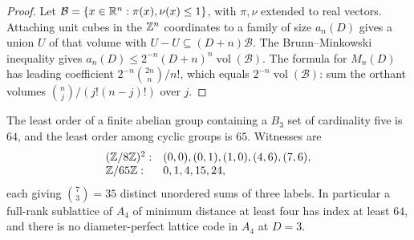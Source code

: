 
\begin{proof}
Let $\mathcal B=\{x\in\mathbb{R}^n:\pi(x),\nu(x)\le1\}$, with $\pi,\nu$ extended to real
vectors. Attaching unit cubes in the $\mathbb{Z}^n$ coordinates to a family of size $a_n(D)$
gives a union $U$ of that volume with $U-U\subseteq(D+n)\mathcal B$. The
Brunn--Minkowski inequality gives
$a_n(D)\le2^{-n}(D+n)^n\operatorname{vol}(\mathcal B)$. The formula for $M_n(D)$ has
leading coefficient $2^{-n}\binom{2n}{n}/n!$, which equals
$2^{-n}\operatorname{vol}(\mathcal B)$: sum the orthant volumes
$\binom nj/(j!(n-j)!)$ over $j$.
\end{proof}

\begin{theorem}\label{gpp:thm:sidon}
The least order of a finite abelian group containing a $B_3$ set of cardinality five is
$64$, and the least order among cyclic groups is $65$. Witnesses are
\[
 \begin{array}{ll}
 (\mathbb{Z}/8\mathbb{Z})^2: & (0,0),(0,1),(1,0),(4,6),(7,6),\\
 \mathbb{Z}/65\mathbb{Z}: & 0,1,4,15,24 ,
 \end{array}
\]
each giving $\binom73=35$ distinct unordered sums of three labels. In particular a
full-rank sublattice of $A_4$ of minimum distance at least four has index at least $64$,
and there is no diameter-perfect lattice code in $A_4$ at $D=3$.
\end{theorem}

